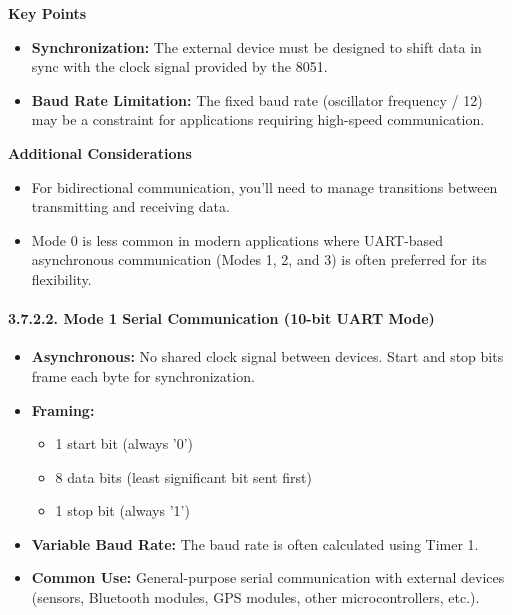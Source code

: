 \documentclass[
]{article}
\begin{document}
\textbf{Key Points}

\begin{itemize}
\item
  \textbf{Synchronization:} The external device must be designed to
  shift data in sync with the clock signal provided by the 8051.
\item
  \textbf{Baud Rate Limitation:} The fixed baud rate (oscillator
  frequency / 12) may be a constraint for applications requiring
  high-speed communication.
\end{itemize}

\textbf{Additional Considerations}

\begin{itemize}
\item
  For bidirectional communication, you'll need to manage transitions
  between transmitting and receiving data.
\item
  Mode 0 is less common in modern applications where UART-based
  asynchronous communication (Modes 1, 2, and 3) is often preferred for
  its flexibility.
\end{itemize}

\hypertarget{3722-mode-1-serial-communication-10-bit-uart-mode}{%
\paragraph{3.7.2.2. Mode 1 Serial Communication (10-bit UART
Mode)}\label{3722-mode-1-serial-communication-10-bit-uart-mode}}

\begin{itemize}
\item
  \textbf{Asynchronous:} No shared clock signal between devices. Start
  and stop bits frame each byte for synchronization.
\item
  \textbf{Framing:}

  \begin{itemize}
  \item
    1 start bit (always '0')
  \item
    8 data bits (least significant bit sent first)
  \item
    1 stop bit (always '1')
  \end{itemize}
\item
  \textbf{Variable Baud Rate:} The baud rate is often calculated using
  Timer 1.
\item
  \textbf{Common Use:} General-purpose serial communication with
  external devices (sensors, Bluetooth modules, GPS modules, other
  microcontrollers, etc.).
\end{itemize}
\end{document}
